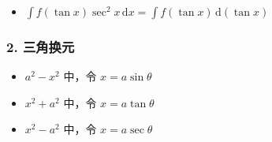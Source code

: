 \begin{itemize}
\item $\displaystyle{\int f(\tan x)\sec^2x\,\mathrm{d}x=\int f(\tan x)\,\mathrm{d}(\tan x)}$
\end{itemize} 
\subsubsection{2. 三角换元}
\begin{itemize}
\item $a^2-x^2$ 中，令 $x=a\sin\theta$ 
\end{itemize}
\begin{itemize}
\item $x^2+a^2$ 中，令 $x=a\tan \theta$ 
\end{itemize}
\begin{itemize}
\item $x^2-a^2$ 中，令 $x=a\sec\theta$ 
\end{itemize}

